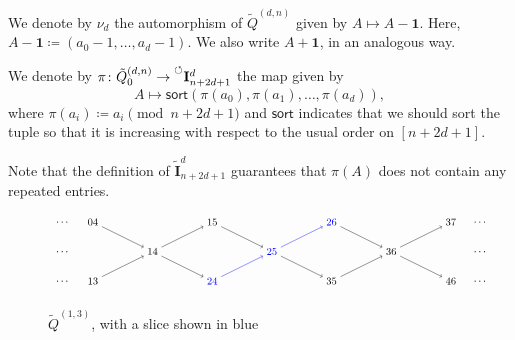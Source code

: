 \documentclass[ALCO,Unicode,published]{cedram}
\newcommand{\nonconsec}[2]{\prescript{\circlearrowleft}{}{\mathbf{I}_{#1}^{#2}}}
\newcommand{\derset}[2]{{\tilde{\mathbf{I}}_{#1}^{#2}}}
\newcommand{\onevec}{\mathbf{1}} %
\newcommand{\tqdn}{\tilde{Q}^{(d, n)}}
\begin{document}
We denote by $\nu_{d}$ the automorphism of $\tilde{Q}^{(d,n)}$ given by $A \mapsto A - \onevec$. Here, $A - \onevec \coloneqq (a_{0} - 1, \dots, a_{d} - 1)$. We also write $A + \onevec$, in an analogous way.

\begin{defi}\label{def:pi}
We denote by $\pi\colon \tqdn_{0} \rightarrow \nonconsec{n + 2d + 1}{d}$ the map given by \[A \mapsto \mathsf{sort}(\pi(a_{0}), \pi(a_{1}), \dots, \pi(a_{d})),\] where $\pi(a_{i}) \coloneqq a_{i} \pmod{n + 2d + 1}$ and $\mathsf{sort}$ indicates that we should sort the tuple so that it is increasing with respect to the usual order on $[n + 2d + 1]$.
\end{defi}

Note that the definition of $\derset{n + 2d + 1}{d}$ guarantees that $\pi(A)$ does not contain any repeated entries.

\begin{figure}
\caption{$\tilde{Q}^{(1,3)}$, with a slice shown in blue}\label{fig:q13}
\[
\scalebox{0.75}{
\begin{tikzpicture}

\node(zca) at (0,0){13};
\node(baz) at (0,2){04};
\node(aba) at (2,1){14};
\node(zcb) at (4,0){\color{blue}{24}};
\node(baa) at (4,2){15};
\node(abb) at (6,1){\color{blue}{25}};
\node(zcc) at (8,0){35};
\node(bab) at (8,2){\color{blue}{26}};
\node(abc) at (10,1){36};
\node(zcd) at (12,0){46};
\node(bac) at (12,2){37};

\node at (-1,0){\dots};
\node at (-1,1){\dots};
\node at (-1,2){\dots};

\node at (13,0){\dots};
\node at (13,1){\dots};
\node at (13,2){\dots};

\draw[->] (zca) -- (aba);
\draw[->] (aba) -- (baa);
\draw[->] (baz) -- (aba);
\draw[->] (aba) -- (zcb);
\draw[->] (baa) -- (abb);
\draw[->] (abb) -- (zcc);
\draw[->,blue] (zcb) -- (abb);
\draw[->,blue] (abb) -- (bab);
\draw[->] (bab) -- (abc);
\draw[->] (abc) -- (zcd);
\draw[->] (zcc) -- (abc);
\draw[->] (abc) -- (bac);

\end{tikzpicture}
}
\]
\end{figure}
\end{document}
